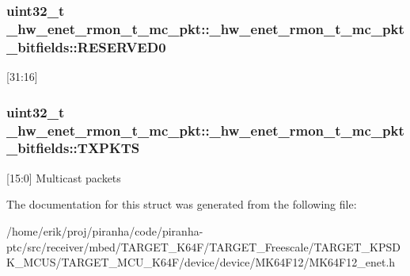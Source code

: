 \subsubsection[{\texorpdfstring{R\+E\+S\+E\+R\+V\+E\+D0}{RESERVED0}}]{\setlength{\rightskip}{0pt plus 5cm}uint32\+\_\+t \+\_\+hw\+\_\+enet\+\_\+rmon\+\_\+t\+\_\+mc\+\_\+pkt\+::\+\_\+hw\+\_\+enet\+\_\+rmon\+\_\+t\+\_\+mc\+\_\+pkt\+\_\+bitfields\+::\+R\+E\+S\+E\+R\+V\+E\+D0}\hypertarget{struct__hw__enet__rmon__t__mc__pkt_1_1__hw__enet__rmon__t__mc__pkt__bitfields_a1784e4e5573c9db391e5231615519879}{}\label{struct__hw__enet__rmon__t__mc__pkt_1_1__hw__enet__rmon__t__mc__pkt__bitfields_a1784e4e5573c9db391e5231615519879}
\mbox{[}31\+:16\mbox{]} 
\subsubsection[{\texorpdfstring{T\+X\+P\+K\+TS}{TXPKTS}}]{\setlength{\rightskip}{0pt plus 5cm}uint32\+\_\+t \+\_\+hw\+\_\+enet\+\_\+rmon\+\_\+t\+\_\+mc\+\_\+pkt\+::\+\_\+hw\+\_\+enet\+\_\+rmon\+\_\+t\+\_\+mc\+\_\+pkt\+\_\+bitfields\+::\+T\+X\+P\+K\+TS}\hypertarget{struct__hw__enet__rmon__t__mc__pkt_1_1__hw__enet__rmon__t__mc__pkt__bitfields_a2374eca34eae47c58f825bd11d838bcc}{}\label{struct__hw__enet__rmon__t__mc__pkt_1_1__hw__enet__rmon__t__mc__pkt__bitfields_a2374eca34eae47c58f825bd11d838bcc}
\mbox{[}15\+:0\mbox{]} Multicast packets 

The documentation for this struct was generated from the following file\+:\begin{DoxyCompactItemize}
\item 
/home/erik/proj/piranha/code/piranha-\/ptc/src/receiver/mbed/\+T\+A\+R\+G\+E\+T\+\_\+\+K64\+F/\+T\+A\+R\+G\+E\+T\+\_\+\+Freescale/\+T\+A\+R\+G\+E\+T\+\_\+\+K\+P\+S\+D\+K\+\_\+\+M\+C\+U\+S/\+T\+A\+R\+G\+E\+T\+\_\+\+M\+C\+U\+\_\+\+K64\+F/device/device/\+M\+K64\+F12/M\+K64\+F12\+\_\+enet.\+h\end{DoxyCompactItemize}
